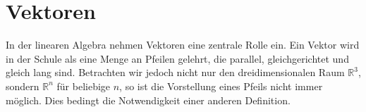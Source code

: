 


%

\section{Vektoren}
In der linearen Algebra nehmen Vektoren eine zentrale Rolle ein. Ein Vektor wird in der Schule als eine Menge an Pfeilen gelehrt, die parallel, gleichgerichtet und gleich lang sind. Betrachten wir jedoch nicht nur den dreidimensionalen Raum $\mathbb{R}^3$, sondern $\mathbb{R}^n$ f\"ur beliebige $n$, so ist die Vorstellung eines Pfeils nicht immer m\"oglich. Dies bedingt die Notwendigkeit einer anderen Definition.

